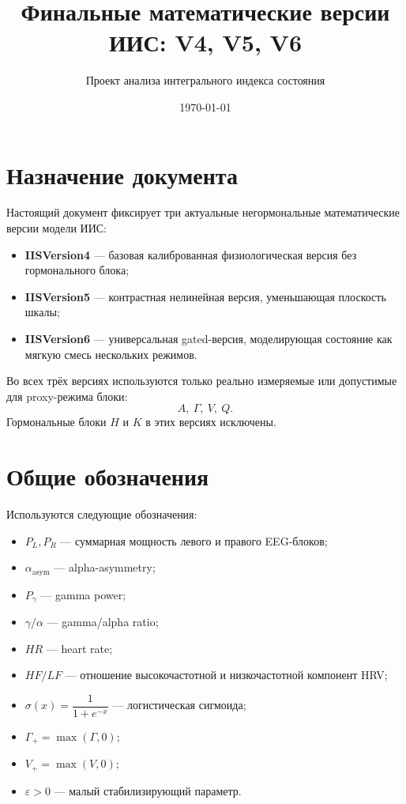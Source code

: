 \documentclass[12pt,a4paper]{article}
\title{Финальные математические версии ИИС: V4, V5, V6}
\author{Проект анализа интегрального индекса состояния}
\date{\today}
\begin{document}
\maketitle

\section{Назначение документа}
Настоящий документ фиксирует три актуальные негормональные математические версии модели ИИС:
\begin{itemize}[leftmargin=1.25cm]
    \item \textbf{IISVersion4} --- базовая калиброванная физиологическая версия без гормонального блока;
    \item \textbf{IISVersion5} --- контрастная нелинейная версия, уменьшающая плоскость шкалы;
    \item \textbf{IISVersion6} --- универсальная gated-версия, моделирующая состояние как мягкую смесь нескольких режимов.
\end{itemize}

Во всех трёх версиях используются только реально измеряемые или допустимые для proxy-режима блоки:
\[
A,\ \Gamma,\ V,\ Q.
\]
Гормональные блоки \(H\) и \(K\) в этих версиях исключены.

\section{Общие обозначения}
Используются следующие обозначения:
\begin{itemize}[leftmargin=1.25cm]
    \item \(P_L, P_R\) --- суммарная мощность левого и правого EEG-блоков;
    \item \(\alpha_{\mathrm{asym}}\) --- alpha-asymmetry;
    \item \(P_\gamma\) --- gamma power;
    \item \(\gamma/\alpha\) --- gamma/alpha ratio;
    \item \(HR\) --- heart rate;
    \item \(HF/LF\) --- отношение высокочастотной и низкочастотной компонент HRV;
    \item \(\sigma(x)=\dfrac{1}{1+e^{-x}}\) --- логистическая сигмоида;
    \item \(\Gamma_+=\max(\Gamma,0)\);
    \item \(V_+=\max(V,0)\);
    \item \(\varepsilon>0\) --- малый стабилизирующий параметр.
\end{itemize}
\end{document}
